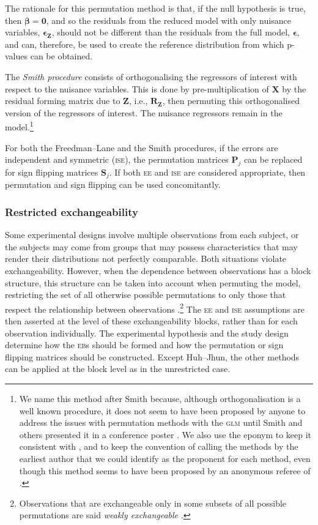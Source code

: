 The rationale for this permutation method is that, if the null hypothesis is true, then $\boldsymbol{\beta}=\mathbf{0}$, and so the residuals from the reduced model with only nuisance variables, $\boldsymbol{\epsilon}_{\mathbf{Z}}$, should not be different than the residuals from the full model, $\boldsymbol{\epsilon}$, and can, therefore, be used to create the reference distribution from which p-values can be obtained.

The \emph{Smith procedure} consists of orthogonalising the regressors of interest with respect to the nuisance variables. This is done by pre-multiplication of $\mathbf{X}$ by the residual forming matrix due to $\mathbf{Z}$, i.e., $\mathbf{R}_{\mathbf{Z}}$, then permuting this orthogonalised version of the regressors of interest. The nuisance regressors remain in the model.\footnote{We name this method after Smith because, although orthogonalisation is a well known procedure, it does not seem to have been proposed by anyone to address the issues with permutation methods with the \textsc{glm} until Smith and others presented it in a conference poster \citep{Nichols2008}. We also use the eponym to keep it consistent with \citet{Ridgway2009}, and to keep the convention of calling the methods by the earliest author that we could identify as the proponent for each method, even though this method seems to have been proposed by an anonymous referee of \citet{OGorman2005}.}

For both the Freedman--Lane and the Smith procedures, if the errors are independent and symmetric (\textsc{ise}), the permutation matrices $\mathbf{P}_{j}$ can be replaced for sign flipping matrices $\mathbf{S}_{j}$. If both \textsc{ee} and \textsc{ise} are considered appropriate, then permutation and sign flipping can be used concomitantly.

\subsubsection{Restricted exchangeability}
\label{sec:restricted}

Some experimental designs involve multiple observations from each subject, or the subjects may come from groups that may possess characteristics that may render their distributions not perfectly comparable. Both situations violate exchangeability. However, when the dependence between observations has a block structure, this structure can be taken into account when permuting the model, restricting the set of all otherwise possible permutations to only those that respect the relationship between observations \citep{Pesarin2001}.\footnote{Observations that are exchangeable only in some subsets of all possible permutations are said \emph{weakly exchangeable} \citep{Good2002}.} The \textsc{ee} and \textsc{ise} assumptions are then asserted at the level of these exchangeability blocks, rather than for each observation individually. The experimental hypothesis and the study design determine how the \textsc{eb}s should be formed and how the permutation or sign flipping matrices should be constructed. Except Huh--Jhun, the other methods can be applied at the block level as in the unrestricted case.

